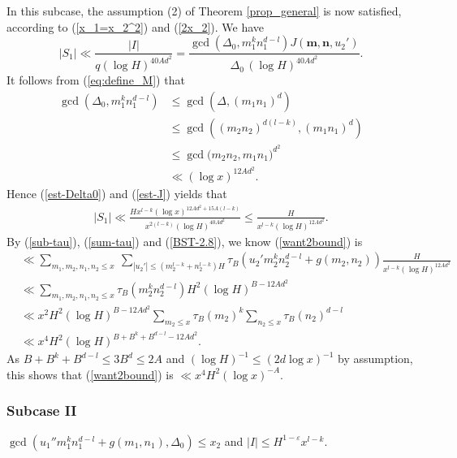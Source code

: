\documentclass[reqno, 11pt]{amsart}
\renewcommand{\leq}{\leqslant}
\theoremstyle{definition}
\theoremstyle{definition}
\renewcommand{\leq}{\leqslant}
\newcommand{\eps}{\varepsilon}
\newcommand{\mm}{\mathbf{m}}
\newcommand{\nn}{\mathbf{n}}
\numberwithin{equation}{section}
\begin{document}
In this subcase, the assumption (2) of Theorem \ref{prop_general} is now satisfied, according to (\ref{x_1=x_2^2}) and (\ref{2x_2}). We have
$$|S_1| \ll \frac{|I|}{q (\log H)^{40 Ad^2}} = \frac{\gcd(\Delta_0, m_1^k n_1^{d-l}) J(\mm, \nn, u_2')}{\Delta_0 \, (\log H)^{40Ad^2}}.$$
It follows from (\ref{eq:define_M}) that
\begin{align*}
    \gcd(\Delta_0, m_1^k n_1^{d-l}) & \leq \gcd(\Delta, (m_1n_1)^d) \\
     & \leq \gcd((m_2n_2)^{d(l-k)}, (m_1n_1)^d) \\
    &  \leq \gcd \big(m_2n_2, m_1n_1\big)^{d^2} \\
    &  \ll (\log x)^{12Ad^2}.
\end{align*}
Hence (\ref{est-Delta0}) and (\ref{est-J}) yields that 
\begin{align*}
    |S_1| \ll \frac{H x^{l-k} (\log x)^{12Ad^2 + 15A(l-k)}}{x^{2(l-k)}  (\log H)^{40Ad^2}} \leq \frac{H}{x^{l-k} (\log H)^{12Ad^2}}.
\end{align*}
By (\ref{sub-tau}), (\ref{sum-tau}) and (\ref{BST-2.8}), we know (\ref{want2bound}) is 
\begin{align*}
	& \ll \sum_{m_1,m_2,n_1,n_2 \leq x} \ \sum_{|u_2'| \leq (m_2^{l-k} + n_2^{l-k}) H} \tau_B( u_2' m_2^k n_2^{d-l} + g(m_2,n_2)) \frac{H}{x^{l-k} (\log H)^{12Ad^2}} \\
	& \ll \sum_{m_1,m_2,n_1,n_2 \leq x} \tau_B(m_2^k n_2^{d-l}) H^2 (\log H)^{B - 12Ad^2} \\
        & \ll x^2 H^2 (\log H)^{B - 12 Ad^2} \sum_{m_2 \leq x} \tau_B(m_2)^k \sum_{n_2 \leq x} \tau_B(n_2)^{d-l} \\
        & \ll x^4 H^2 (\log H)^{B + B^k + B^{d-l} - 12 Ad^2}.
\end{align*}
As $B+B^k+B^{d-l} \leq 3B^d \leq 2A$ and $(\log H)^{-1} \leq (2d \log x)^{-1}$ by assumption, this shows that (\ref{want2bound}) is $\ll x^4H^2 (\log x)^{-A}$.



\subsubsection*{Subcase II}
 $\gcd(u_1'' m_1^k n_1^{d-l} + g(m_1,n_1), \Delta_0) \leq x_2$ and $|I| \leq H^{1 - \eps} x^{l-k}$.
\end{document}
